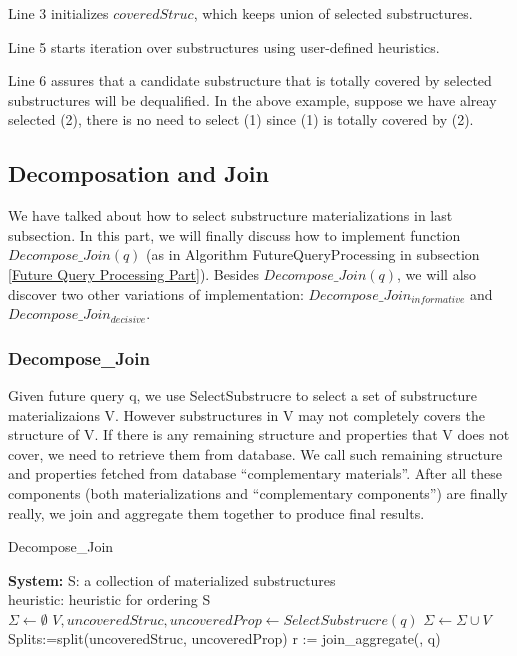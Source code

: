 Line 3 initializes $coveredStruc$, which keeps union of selected substructures.

Line 5 starts iteration over substructures using user-defined heuristics. 

Line 6 assures that a candidate substructure that is totally covered by selected substructures will be dequalified. In the above example, suppose we have alreay selected (2), there is no need to select (1) since (1) is totally covered by (2). 

\subsection{Decomposation and Join}
\label{Query Decomposition}
We have talked about how to select substructure materializations in last subsection. In this part, we will finally discuss how to implement function $Decompose\_Join(q)$ (as in Algorithm FutureQueryProcessing in subsection \ref{Future Query Processing Part}). Besides $Decompose\_Join(q)$, we will also discover two other variations of implementation: $Decompose\_Join_{informative}$ and $Decompose\_Join_{decisive}$. 

\subsubsection{Decompose\_Join}
Given future query q, we use SelectSubstrucre to select a set of substructure materializaions V. However substructures in V may not completely covers the structure of V. If there is any remaining structure and properties that V does not cover, we need to retrieve them from database. We call such remaining structure and properties fetched from database ``complementary  materials''. After all these components (both materializations and ``complementary  components'') are finally really, we join and aggregate them together to produce final results.

\begin{algorithm}[H]
	\caption{Decompose\_Join}
	\LinesNumbered
	\textbf{System:} S: a collection of materialized substructures\\ heuristic: heuristic for ordering S\\
	$\Sigma \gets \emptyset $\;
	$V, uncoveredStruc, uncoveredProp \gets SelectSubstrucre(q) $\;
	$\Sigma \gets \Sigma \cup V $\;
	Splits:=split(uncoveredStruc, uncoveredProp)\;
	r := join\_aggregate(\Sigma, q)\;
\end{algorithm}

